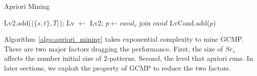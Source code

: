 \begin{algorithm}
\caption{Apriori Mining}
\label{algo:apriori_mining}
\begin{algorithmic}
\State Lv2.add($\langle \{s,t\}, T \rangle$);
\State Lv $\gets$ Lv2;
\EndFor
{}
				\State $p \gets cand_v$ join $cand$
					\State LvCand.add($p$)
				\EndIf
			\EndFor
		\EndFor
	\Else
	\EndIf
\EndWhile
\end{algorithmic}
\end{algorithm}

Algorithm~\ref{algo:apriori_mining} takes exponential complexity to mine GCMP. There
are two major factors dragging the performance. First, the size of $Sr_s$ affects
the number initial size of $2$-patterns. Second, the level that apriori runs. In later
sections, we exploit the property of GCMP to reduce the two factors.